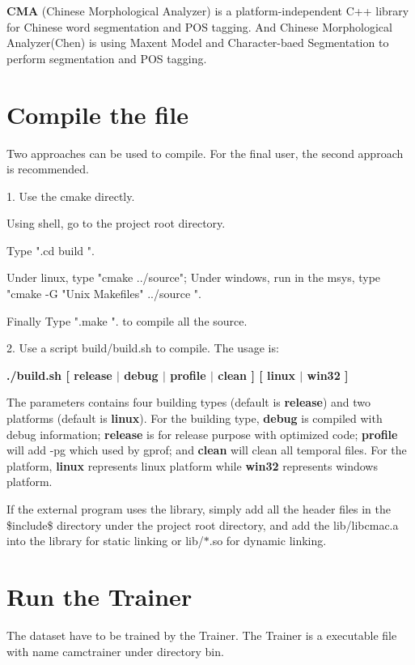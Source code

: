 {\bfseries CMA} (Chinese Morphological Analyzer) is a platform-\/independent C++ library for Chinese word segmentation and POS tagging. And Chinese Morphological Analyzer(Chen) is using Maxent Model and Character-\/baed Segmentation to perform segmentation and POS tagging.\section{Compile the file}\label{index_compilefile}
Two approaches can be used to compile. For the final user, the second approach is recommended.

1. Use the cmake directly.


\begin{DoxyEnumerate}
\item Using shell, go to the project root directory. 
\item Type ".cd build ". 
\item Under linux, type "cmake ../source"; Under windows, run in the msys, type "cmake -\/G "Unix Makefiles" ../source ". 
\item Finally Type ".make ". to compile all the source. 
\end{DoxyEnumerate}

2. Use a script build/build.sh to compile. The usage is:\par
 {\bfseries ./build.sh [ release $|$ debug $|$ profile $|$ clean ] [ linux $|$ win32 ]}\par


The parameters contains four building types (default is {\bfseries release}) and two platforms (default is {\bfseries linux}). For the building type, {\bfseries debug} is compiled with debug information; {\bfseries release} is for release purpose with optimized code; {\bfseries profile} will add -\/pg which used by gprof; and {\bfseries clean} will clean all temporal files. For the platform, {\bfseries linux} represents linux platform while {\bfseries win32} represents windows platform.

If the external program uses the library, simply add all the header files in the \$include\$ directory under the project root directory, and add the lib/libcmac.a into the library for static linking or lib/$\ast$.so for dynamic linking.\section{Run the Trainer}\label{index_runtrainer}
The dataset have to be trained by the Trainer. The Trainer is a executable file with name camctrainer under directory bin.

